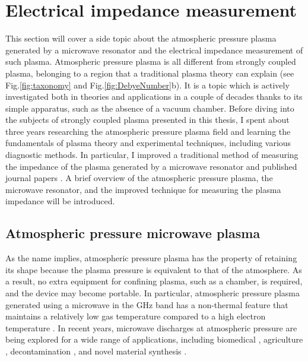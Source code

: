 
\chapter{Electrical impedance measurement}
\label{sec:ap7}

This section will cover a side topic about the atmospheric pressure plasma generated by a microwave resonator and the electrical impedance measurement of such plasma. Atmospheric pressure plasma is all different from strongly coupled plasma, belonging to a region that a traditional plasma theory can explain (see Fig.\ref{fig:taxonomy} and Fig.\ref{fig:DebyeNumber}b). It is a topic which is actively investigated both in theories and applications in a couple of decades thanks to its simple apparatus, such as the absence of a vacuum chamber. Before diving into the subjects of strongly coupled plasma presented in this thesis, I spent about three years researching the atmospheric pressure plasma field and learning the fundamentals of plasma theory and experimental techniques, including various diagnostic methods. In particular, I improved a traditional method of measuring the impedance of the plasma generated by a microwave resonator and published journal papers \cite{lee2017situ, nam2017asymmetric}. A brief overview of the atmospheric pressure plasma, the microwave resonator, and the improved technique for measuring the plasma impedance will be introduced.

\section{Atmospheric pressure microwave plasma}
\label{sec:ap7-1}

As the name implies, atmospheric pressure plasma has the property of retaining its shape because the plasma pressure is equivalent to that of the atmosphere. As a result, no extra equipment for confining plasma, such as a chamber, is required, and the device may become portable. In particular, atmospheric pressure plasma generated using a microwave in the GHz band has a non-thermal feature that maintains a relatively low gas temperature compared to a high electron temperature \cite{tendero2006atmospheric}. In recent years, microwave discharges at atmospheric pressure are being explored for a wide range of applications, including biomedical \cite{lu2016reactive, graves2014low}, agriculture \cite{sera2008germination}, decontamination \cite{kuo2007fan}, and novel material synthesis \cite{kramer2015cold, vollath2008plasma}.

